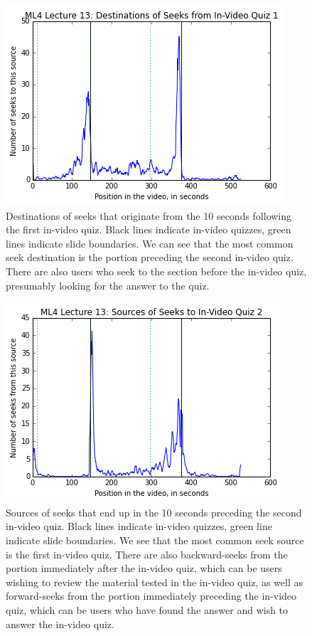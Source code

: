 \documentclass{sigchi}
\begin{document}
\begin{figure}
\includegraphics[width=1.0\columnwidth]{seekdest1}
\caption{Destinations of seeks that originate from the 10 seconds following the first in-video quiz. Black lines indicate in-video quizzes, green lines indicate slide boundaries. We can see that the most common seek destination is the portion preceding the second in-video quiz. There are also users who seek to the section before the in-video quiz, presumably looking for the answer to the quiz.}
\label{fig:seekdest1}
\end{figure}

\begin{figure}
\includegraphics[width=1.0\columnwidth]{seeksrc2}
\caption{Sources of seeks that end up in the 10 seconds preceding the second in-video quiz. Black lines indicate in-video quizzes, green line indicate slide boundaries. We see that the most common seek source is the first in-video quiz. There are also backward-seeks from the portion immediately after the in-video quiz, which can be users wishing to review the material tested in the in-video quiz, as well as forward-seeks from the portion immediately preceding the in-video quiz, which can be users who have found the answer and wish to answer the in-video quiz.}
\label{fig:seeksrc2}
\end{figure}
\end{document}
